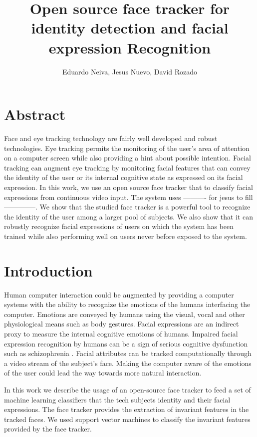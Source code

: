 \documentclass[]{article}
\title{Open source face tracker for identity detection and facial expression Recognition}
\author{Eduardo Neiva, Jesus Nuevo, David Rozado}
\begin{document}
\maketitle

\section{Abstract}
Face and eye tracking technology are fairly well developed and robust technologies. Eye tracking permits the monitoring 
of the user's area of attention on a computer screen while also providing a hint about possible intention.
Facial tracking can augment eye tracking by monitoring facial features that can convey the identity of the user or its
internal cognitive state as expressed on its facial expression. In this work, we use an open source face tracker that to
classify facial expressions from continuous video input. The system uses ---------- for jesus to fill --------------. We
show that the studied face tracker is a powerful tool to recognize the identity of the user among a larger pool of
subjects. We also show  that it can robustly recognize facial expressions of users on which the system has been trained
while also performing well on users never before exposed to the system.


\section{Introduction}
Human computer interaction could be augmented by providing a computer systems with the ability to recognize the emotions
of the humans interfacing the computer. Emotions are conveyed by humans  using the visual, vocal and other physiological
means such as body gestures. Facial expressions are an indirect proxy to measure the internal cognitive emotions of
humans. Impaired facial expression recognition by humans can be a sign of serious cognitive dysfunction such as
schizophrenia \cite{Edwards2002789}.  Facial attributes can be tracked computationally through a video stream of the
subject's face. Making the computer aware of the emotions of the user could lead the way towards more natural interaction.


In this work we describe the usage of an open-source face tracker to feed a set of machine learning classifiers that the
tech subjects identity and their facial expressions. The face tracker provides the extraction of invariant features in
the tracked faces. We used support vector machines  to classify the invariant features provided by the face tracker.
\end{document}
